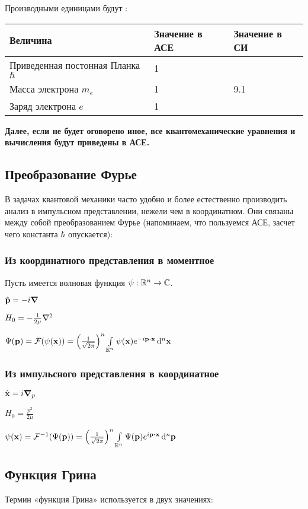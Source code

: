 Производными единицами будут :

\begin{table}[h]
\begin{tabular}{|l|l|l|}
\hline
Величина & Значение в АСЕ & Значение в СИ \\\hline
Приведенная постонная Планка $\hbar$ & 1 & \\\hline
Масса электрона $m_e$ & 1 &  9.1  \\\hline
Заряд электрона $e$   & 1 & \\\hline
\end{tabular}
\end{table}

\textbf{Далее, если не будет оговорено иное, все квантомеханические уравнения и вычисления будут приведены в АСЕ.}

\subsection{Преобразование Фурье}
В задачах квантовой механики часто удобно и более естественно производить анализ в импульсном представлении, нежели чем в координатном. Они связаны между собой преобразованием Фурье (напоминаем, что пользуемся АСЕ, засчет чего константа $\hbar$ опускается):

\subsubsection{Из координатного представления в моментное}
Пусть имеется волновая функция $\psi: \mathbb{R}^n \to \mathbb{C}$. 

$\hat{\vb{p}} = -i \grad$

$H_0 = - \frac{1}{2 \mu} \laplacian$

$\Psi(\vb{p}) = \mcF(\psi(\vb{x})) = \left(\frac{1}{\sqrt{2 \pi}}\right)^n \int\limits_{\bbR^n} \psi(\vb{x}) e^{-i \vb{p} \vdot \vb{x}} \dd[n]{\vb{x}}$

\subsubsection{Из импульсного представления в координатное}

$\hat{\vb{x}} = i \grad_p$

$H_0 = \frac{p^2}{2 \mu}$

$\psi(\vb{x}) = \mcF^{-1}(\Psi(\vb{p})) = \left(\frac{1}{\sqrt{2 \pi}}\right)^n \int\limits_{\bbR^n} \Psi(\vb{p}) e^{i \vb{p} \vdot \vb{x}} \dd[n]{\vb{p}}$

\subsection{Функция Грина}
Термин «функция Грина» используется в двух значениях:

